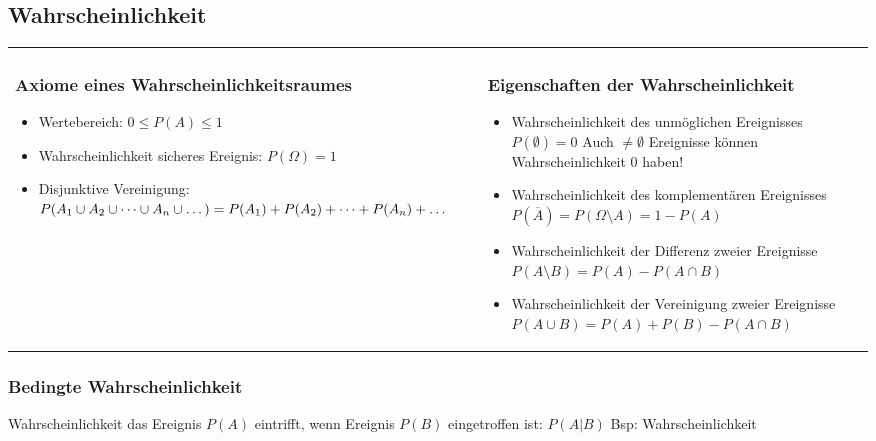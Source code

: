 \documentclass[margin=normal]{tex/hsrzf}
\begin{document}
\subsection{Wahrscheinlichkeit}
\begin{tabular}{m{7.5cm} m{12cm}}
\subsubsection*{Axiome eines Wahrscheinlichkeitsraumes}
\begin{itemize}
    \item Wertebereich: \newline $0 \leq P(A) \leq 1$
    \item Wahrscheinlichkeit sicheres Ereignis: \newline$P(\Omega) = 1$
    \item Disjunktive Vereinigung:\newline $P(A_1 \cup A_2 \cup \dots \cup A_n \cup \dots)
              \newline = P(A_1) + P(A_2) + \dots + P(A_n) + \dots$
\end{itemize}
&
\subsubsection*{Eigenschaften der Wahrscheinlichkeit}


    \begin{itemize}
        \item Wahrscheinlichkeit des unmöglichen Ereignisses \newline $P(\emptyset) = 0$ \newline
              Auch $\neq \emptyset$ Ereignisse können Wahrscheinlichkeit 0 haben!
        \item Wahrscheinlichkeit des komplementären Ereignisses \newline
              $P(\overline{A}) = P(\Omega \setminus A) = 1 - P(A)$
        \item Wahrscheinlichkeit der Differenz zweier Ereignisse \newline
              $P(A \setminus B) = P(A) - P(A \cap B)$
        \item Wahrscheinlichkeit der Vereinigung zweier Ereignisse \newline
              $P(A \cup B) = P(A) + P(B) - P(A \cap B)$

    \end{itemize}
\end{tabular}
\subsubsection{Bedingte Wahrscheinlichkeit}
Wahrscheinlichkeit das Ereignis $P(A)$ eintrifft,
wenn Ereignis $P(B)$ eingetroffen ist: $P(A|B)$ 
Bsp: Wahrscheinlichkeit
\end{document}
